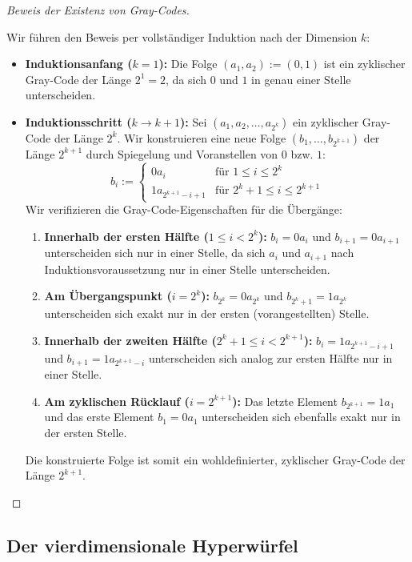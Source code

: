 \begin{proof}[Beweis der Existenz von Gray-Codes]
\begin{math-stroke}
Wir führen den Beweis per vollständiger Induktion nach der Dimension $k$:
\begin{itemize}
    \item \textbf{Induktionsanfang ($k=1$):} Die Folge $(a_1, a_2) := (0, 1)$ ist ein zyklischer Gray-Code der Länge $2^1 = 2$, da sich $0$ und $1$ in genau einer Stelle unterscheiden.
    \item \textbf{Induktionsschritt ($k \to k+1$):} Sei $(a_1, a_2, \dots, a_{2^k})$ ein zyklischer Gray-Code der Länge $2^k$. Wir konstruieren eine neue Folge $(b_1, \dots, b_{2^{k+1}})$ der Länge $2^{k+1}$ durch Spiegelung und Voranstellen von $0$ bzw. $1$:
    \[
    b_i := \begin{cases}
    0a_i & \text{für } 1 \le i \le 2^k \\
    1a_{2^{k+1} - i + 1} & \text{für } 2^k + 1 \le i \le 2^{k+1}
    \end{cases}
    \]
    Wir verifizieren die Gray-Code-Eigenschaften für die Übergänge:
    \begin{enumerate}[label=\textbf{(\arabic*)}]
        \item \textbf{Innerhalb der ersten Hälfte ($1 \le i < 2^k$):} $b_i = 0a_i$ und $b_{i+1} = 0a_{i+1}$ unterscheiden sich nur in einer Stelle, da sich $a_i$ und $a_{i+1}$ nach Induktionsvoraussetzung nur in einer Stelle unterscheiden.
        \item \textbf{Am Übergangspunkt ($i = 2^k$):} $b_{2^k} = 0a_{2^k}$ und $b_{2^k+1} = 1a_{2^k}$ unterscheiden sich exakt nur in der ersten (vorangestellten) Stelle.
        \item \textbf{Innerhalb der zweiten Hälfte ($2^k + 1 \le i < 2^{k+1}$):} $b_i = 1a_{2^{k+1}-i+1}$ und $b_{i+1} = 1a_{2^{k+1}-i}$ unterscheiden sich analog zur ersten Hälfte nur in einer Stelle.
        \item \textbf{Am zyklischen Rücklauf ($i = 2^{k+1}$):} Das letzte Element $b_{2^{k+1}} = 1a_1$ und das erste Element $b_1 = 0a_1$ unterscheiden sich ebenfalls exakt nur in der ersten Stelle.
    \end{enumerate}
    Die konstruierte Folge ist somit ein wohldefinierter, zyklischer Gray-Code der Länge $2^{k+1}$.
\end{itemize}
\end{math-stroke}
\end{proof}

\subsection{Der vierdimensionale Hyperwürfel}

